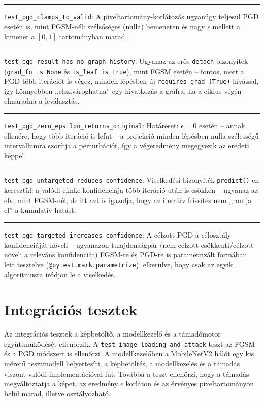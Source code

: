 \medskip
\noindent\rule{\linewidth}{0.3pt}

\medskip
\noindent\texttt{test\_pgd\_clamps\_to\_valid}: A pixeltartomány-korlátozás ugyanúgy teljesül PGD esetén is, mint
FGSM-nél: szélsőséges (nulla) bemeneten és nagy $\epsilon$ mellett a kimenet a $[0, 1]$ tartományban marad. 

\medskip
\noindent\rule{\linewidth}{0.3pt}

\medskip
\noindent\texttt{test\_pgd\_result\_has\_no\_graph\_history}: Ugyanaz az erős \texttt{detach}-bizonyíték (\texttt{grad\_fn is 
None} és \texttt{is\_leaf is True}), mint FGSM esetén -- fontos, mert a PGD több iterációt is végez, minden lépésben új 
\texttt{requires\_grad\_(True)} hívással, így könnyebben ,,elszivároghatna'' egy hivatkozás a gráfra, ha a ciklus végén 
elmaradna a leválasztás. 

\medskip
\noindent\rule{\linewidth}{0.3pt}

\medskip
\noindent\texttt{test\_pgd\_zero\_epsilon\_returns\_original}: Határeset: $\epsilon=0$ esetén -- annak ellenére, hogy több 
iteráció is lefut -- a projekció minden lépésben nulla szélességű intervallumra szorítja a perturbációt, így a végeredmény 
megegyezik az eredeti képpel. 

\medskip
\noindent\rule{\linewidth}{0.3pt}

\medskip
\noindent\texttt{test\_pgd\_untargeted\_reduces\_confidence}: Viselkedési bizonyíték \texttt{predict()}-en 
keresztül: a valódi címke konfidenciája több iteráció után is csökken -- ugyanaz az elv, mint FGSM-nél, de itt azt is igazolja, 
hogy az iteratív frissítés nem ,,rontja el'' a kumulatív hatást. 

\medskip
\noindent\rule{\linewidth}{0.3pt}

\medskip
\noindent\texttt{test\_pgd\_targeted\_increases\_confidence}: A célzott PGD a célosztály konfidenciáját 
növeli -- ugyanazon tulajdonságpár (nem célzott csökkenti/célzott növeli a releváns konfidenciát) FGSM-re és PGD-re is 
parametrizált formában lett tesztelve (\texttt{@pytest.mark.parametrize}), elkerülve, hogy csak az egyik algoritmusra íródjon le 
a viselkedés. 

\bigskip

\section{Integrációs tesztek}

Az integrációs tesztek a képbetöltő, a modellkezelő és a támadómotor együttműködését ellenőrzik. 
A \texttt{test\_image\_loading\_and\_attack} teszt az FGSM és a PGD módszert is ellenőrzi. 
A modellkezelőben a MobileNetV2 hálót egy kis méretű tesztmodell helyettesíti, a képbetöltés, a modellkezelés és a támadás viszont 
valódi implementációval fut. 
Továbbá a teszt ellenőrzi, hogy a támadás megváltoztatja a képet, az eredmény $\epsilon$ korláton és az érvényes 
pixeltartományon belül marad, illetve osztályozható. 

